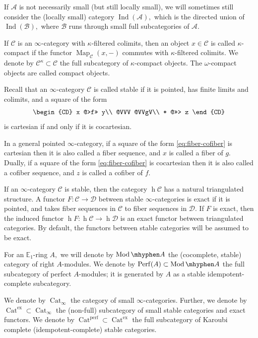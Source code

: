 \documentclass[11pt,leqno]{amsart}
\numberwithin{equation}{section}
\def\h{\operatorname{h}}
\def\Map{\operatorname{Map}}
\newcommand{\hy}{\mhyphen}
\newcommand{\Cat}{\operatorname{Cat}}
\newcommand{\ex}{\operatorname{ex}}
\newcommand{\bE}{{\mathbb E}}
\newcommand{\cD}{{\mathcal D}}
\newcommand{\cA}{{\mathcal A}}
\newcommand{\cB}{{\mathcal B}}
\newcommand{\cC}{{\mathcal C}}
\newcommand{\Perf}{\operatorname{Perf}}
\newcommand{\perf}{\operatorname{perf}}
\newcommand{\Ind}{\operatorname{Ind}}
\newcommand{\Mod}{\operatorname{Mod}}
\begin{document}
If $\cA$ is not necessarily small (but still locally small), we will sometimes still consider the (locally small) category $\Ind(\cA),$ which is the directed union of $\Ind(\cB),$ where $\cB$ runs through small full subcategories of $\cA.$

If $\cC$ is an $\infty$-category with $\kappa$-filtered colimits, then an object $x\in\cC$ is called $\kappa$-compact if the functor $\Map_{\cC}(x,-)$ commutes with $\kappa$-filtered colimits. We denote by $\cC^{\kappa}\subset\cC$ the full subcategory of $\kappa$-compact objects. The $\omega$-compact objects are called compact objects. 

Recall that an $\infty$-category $\cC$ is called stable if it is pointed, has finite limits and colimits, and a square of the form
\begin{equation}\label{eq:fiber-cofiber}
\begin{CD}
x @>f>> y\\
@VVV @VVgV\\
* @>>> z
\end{CD}
\end{equation}
is cartesian if and only if it is cocartesian. 

In a general pointed $\infty$-category, if a square of the form \eqref{eq:fiber-cofiber} is cartesian then it is also called a fiber sequence, and $x$ is called a fiber of $g.$ Dually, if a square of the form \eqref{eq:fiber-cofiber} is cocartesian then it is also called a cofiber sequence, and $z$ is called a cofiber of $f.$ 

If an $\infty$-category $\cC$ is stable, then the category $\h\cC$ has a natural triangulated structure. A functor $F:\cC\to\cD$ between stable $\infty$-categories is exact if it is pointed, and takes fiber sequences in $\cC$ to fiber sequences in $\cD.$ If $F$ is exact, then the induced functor $\h F:\h\cC\to \h\cD$ is an exact functor between triangulated categories. By default, the functors between stable categories will be assumed to be exact.

For an $\bE_1$-ring $A,$ we will denote by $\Mod\hy A$ the (cocomplete, stable) category of right $A$-modules. We denote by $\Perf(A)\subset\Mod\hy A$ the full subcategory of perfect $A$-modules; it is generated by $A$ as a stable idempotent-complete subcategory.

We denote by $\Cat_{\infty}$ the category of small $\infty$-categories. Further, we denote by $\Cat^{\ex}\subset\Cat_{\infty}$ the (non-full) subcategory of small stable categories and exact functors. We denote by $\Cat^{\perf}\subset \Cat^{\ex}$ the full subcategory of Karoubi complete (idempotent-complete) stable categories.
\end{document}
